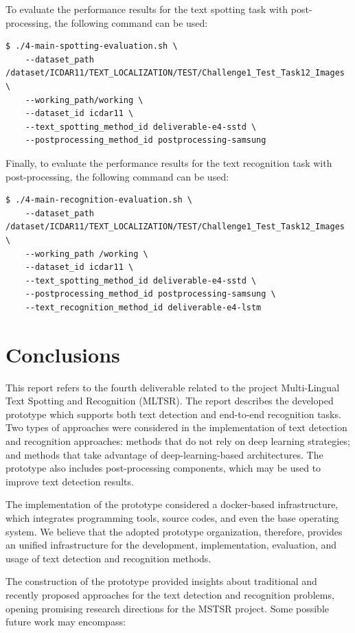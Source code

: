 To evaluate the performance results for the text spotting task with post-processing, the following command can be used:
\begin{lstlisting}[style=fancyterminal]
 $ ./4-main-spotting-evaluation.sh \
    --dataset_path /dataset/ICDAR11/TEXT_LOCALIZATION/TEST/Challenge1_Test_Task12_Images \
    --working_path/working \
    --dataset_id icdar11 \
    --text_spotting_method_id deliverable-e4-sstd \
    --postprocessing_method_id postprocessing-samsung
\end{lstlisting}

Finally, to evaluate the performance results for the text recognition task with post-processing, the following command can be used:
\begin{lstlisting}[style=fancyterminal]
 $ ./4-main-recognition-evaluation.sh \
    --dataset_path /dataset/ICDAR11/TEXT_LOCALIZATION/TEST/Challenge1_Test_Task12_Images \
    --working_path /working \
    --dataset_id icdar11 \
    --text_spotting_method_id deliverable-e4-sstd \
    --postprocessing_method_id postprocessing-samsung \
    --text_recognition_method_id deliverable-e4-lstm
\end{lstlisting}


\section{Conclusions}
\label{sec:conclusions}

This report refers to the fourth deliverable related to the project Multi-Lingual Text Spotting and Recognition (MLTSR). The report describes the developed prototype which supports both text detection and end-to-end recognition tasks. Two types of approaches were considered in the implementation of text detection and recognition approaches: methods that do not rely on deep learning strategies; and methods that take advantage of deep-learning-based architectures. The prototype also includes post-processing components, which may be used to improve text detection results. 

The implementation of the prototype considered a docker-based infrastructure, which integrates programming tools, source codes, and even the base operating system. We believe that the adopted prototype organization, therefore, provides an unified infrastructure for the development, implementation, evaluation, and usage of text detection and recognition methods.

The construction of the prototype provided insights about traditional and recently proposed approaches for the text detection and recognition problems, opening promising research directions for the MSTSR project.
Some possible future work may encompass:

